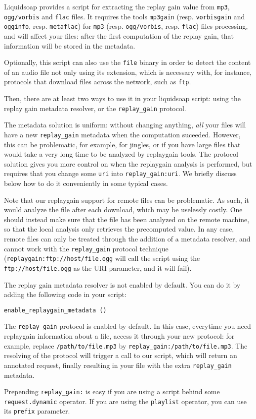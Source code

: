 Liquidsoap provides a script for extracting the replay gain value from \verb+mp3+, \verb+ogg/vorbis+ and \verb+flac+ files. It requires the tools 
\verb+mp3gain+ (resp. \verb+vorbisgain+ and \verb+ogginfo+, resp. \verb+metaflac+) for \verb+mp3+ (resp. \verb+ogg/vorbis+, resp. \verb+flac+) files processing, and will affect your files: 
after the first computation of the replay gain, that information will be stored in the metadata.

Optionally, this script can also use the \verb+file+ binary in order to detect the content of an audio file not only using its extension, which is necessary
with, for instance, protocols that download files across the network, such as \verb+ftp+.

Then, there are at least two ways to use it in your liquidsoap script:
using the replay gain metadata resolver, or the \verb+replay_gain+ protocol.

The metadata solution is uniform: without changing anything, \emph{all} your
files will have a new \verb+replay_gain+ metadata when the computation suceeded. However, this can be problematic,
for example, for jingles,
or if you have large files that would take a very long time
to be analyzed by replaygain tools.
The protocol solution gives you more control on when the replaygain analysis
is performed, but requires that you change some \verb+uri+ into \verb+replay_gain:uri+.
We briefly discuss below how to do it conveniently in some typical cases.

Note that our replaygain support for remote files can be problematic.
As such, it would analyze the file after each download, which
may be uselessly costly. One should instead make sure that the file has
been analyzed on the remote machine, so that the local analysis only retrieves
the precomputed value. In any case, remote files can only be treated through
the addition of a metadata resolver, and cannot work with the \verb+replay_gain+
protocol technique (\verb+replaygain:ftp://host/file.ogg+ will call
the script using the \verb+ftp://host/file.ogg+ as the URI parameter, and
it will fail).

The replay gain metadata resolver is not enabled by default. You can do it 
by adding the following code in your script:

\begin{verbatim}
enable_replaygain_metadata ()
\end{verbatim}
The \verb+replay_gain+ protocol is enabled by default.
In this case, everytime you need replaygain information about a file,
access it through your new protocol: for example,
replace \verb+/path/to/file.mp3+
by \verb+replay_gain:/path/to/file.mp3+.
The resolving of the protocol will trigger a call to our script,
which will return an annotated request, finally resulting in your file
with the extra \verb+replay_gain+ metadata.

Prepending \verb+replay_gain:+ is easy if you are using a script
behind some \verb+request.dynamic+ operator. If you are using the
\verb+playlist+ operator, you can use its \verb+prefix+ parameter.

